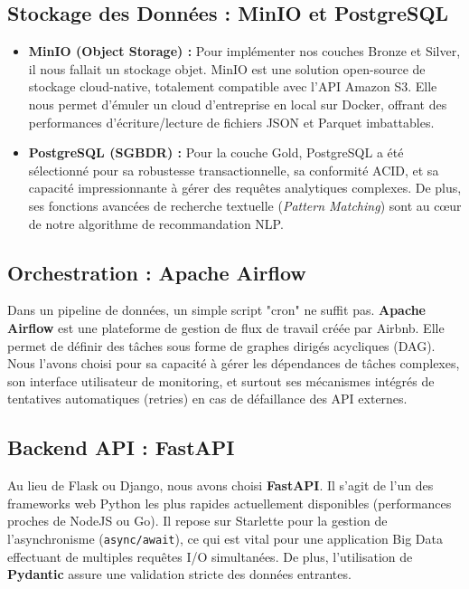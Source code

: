 \documentclass[12pt,a4paper,twoside]{report}
\begin{document}
\subsection{Stockage des Données : MinIO et PostgreSQL}
\begin{itemize}
    \item \textbf{MinIO (Object Storage) :} Pour implémenter nos couches Bronze et Silver, il nous fallait un stockage objet. MinIO est une solution open-source de stockage cloud-native, totalement compatible avec l'API Amazon S3. Elle nous permet d'émuler un cloud d'entreprise en local sur Docker, offrant des performances d'écriture/lecture de fichiers JSON et Parquet imbattables.
    \item \textbf{PostgreSQL (SGBDR) :} Pour la couche Gold, PostgreSQL a été sélectionné pour sa robustesse transactionnelle, sa conformité ACID, et sa capacité impressionnante à gérer des requêtes analytiques complexes. De plus, ses fonctions avancées de recherche textuelle (\textit{Pattern Matching}) sont au cœur de notre algorithme de recommandation NLP.
\end{itemize}

\subsection{Orchestration : Apache Airflow}
Dans un pipeline de données, un simple script "cron" ne suffit pas. \textbf{Apache Airflow} est une plateforme de gestion de flux de travail créée par Airbnb. Elle permet de définir des tâches sous forme de graphes dirigés acycliques (DAG). Nous l'avons choisi pour sa capacité à gérer les dépendances de tâches complexes, son interface utilisateur de monitoring, et surtout ses mécanismes intégrés de tentatives automatiques (retries) en cas de défaillance des API externes.

\subsection{Backend API : FastAPI}
Au lieu de Flask ou Django, nous avons choisi \textbf{FastAPI}. Il s'agit de l'un des frameworks web Python les plus rapides actuellement disponibles (performances proches de NodeJS ou Go). Il repose sur Starlette pour la gestion de l'asynchronisme (\texttt{async/await}), ce qui est vital pour une application Big Data effectuant de multiples requêtes I/O simultanées. De plus, l'utilisation de \textbf{Pydantic} assure une validation stricte des données entrantes.
\end{document}
